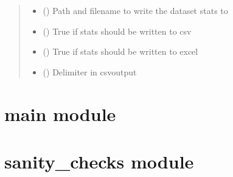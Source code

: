 \documentclass[letterpaper,10pt,english]{sphinxmanual}
\begin{document}
\begin{fulllineitems}
\begin{quote}
\begin{description}
\begin{itemize}
\item {} 
\sphinxAtStartPar
{} () \textendash{} Path and filename to write the dataset stats to

\item {} 
\sphinxAtStartPar
{} () \textendash{} True if stats should be written to csv

\item {} 
\sphinxAtStartPar
{} () \textendash{} True if stats should be written to excel

\item {} 
\sphinxAtStartPar
{} () \textendash{} Delimiter in csv\sphinxhyphen{}output

\end{itemize}

\end{description}\end{quote}

\end{fulllineitems}


\sphinxstepscope


\section{main module}
\label{\detokenize{main:module-main}}\label{\detokenize{main:main-module}}\label{\detokenize{main::doc}}
\sphinxstepscope


\section{sanity\_checks module}
\label{\detokenize{sanity_checks:module-sanity_checks}}\label{\detokenize{sanity_checks:sanity-checks-module}}\label{\detokenize{sanity_checks::doc}}
\end{document}
